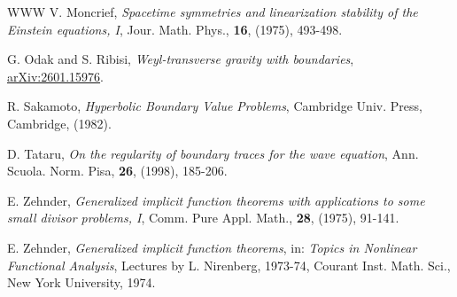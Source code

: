 \documentclass[10pt]{amsart}
\newcommand{\<}{\langle}
\renewcommand{\>}{\rangle}
\theoremstyle{plain}
\theoremstyle{remark}
\theoremstyle{definition}
\numberwithin{equation}{section}
\begin{document}
\begin{thebibliography}{WWW}
 V. Moncrief, {\it Spacetime symmetries and linearization stability of the Einstein equations, I}, 
Jour. Math. Phys., {\bf 16}, (1975), 493-498. 

 G. Odak and S. Ribisi, {\it Weyl-transverse gravity with boundaries}, 
\href{https://arXiv.org/abs/2601.15976}{arXiv:2601.15976}.

 R. Sakamoto, {\it Hyperbolic Boundary Value Problems}, Cambridge Univ. Press, Cambridge, (1982). 

 D. Tataru, {\it On the regularity of boundary traces for the wave equation}, Ann. Scuola. Norm. Pisa, {\bf 26}, 
(1998), 185-206. 

 E. Zehnder, {\it Generalized implicit function theorems with applications to some small divisor problems, I}, 
Comm. Pure Appl. Math., {\bf 28}, (1975), 91-141. 

 E. Zehnder, {\it Generalized implicit function theorems}, in: {\it Topics in Nonlinear Functional Analysis}, Lectures 
by L. Nirenberg, 1973-74, Courant Inst. Math. Sci., New York University, 1974. 
 




\end{thebibliography} 
\end{document}
